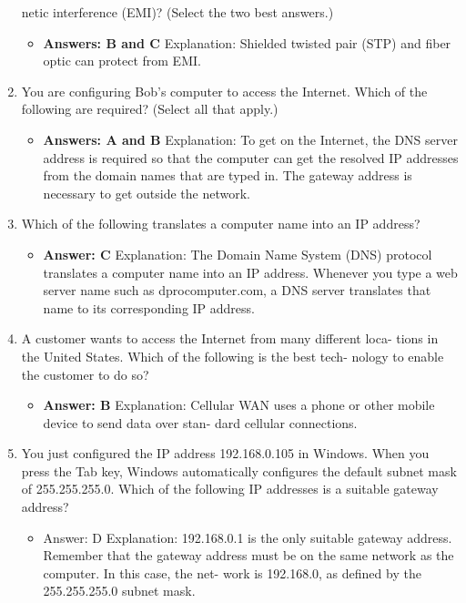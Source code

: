 \documentclass{article}
\begin{document}
\begin{enumerate}
netic interference (EMI)? (Select the two best answers.)
    \begin{itemize}
        \item  \textbf{Answers: B and C} Explanation: Shielded twisted pair (STP) and fiber optic can protect from EMI.
    \end{itemize}
    \item You are configuring Bob’s computer to access the Internet. Which
of the following are required? (Select all that apply.)
    \begin{itemize}
        \item \textbf{Answers: A and B}
Explanation: To get on the Internet, the DNS server address is required so that the
computer can get the resolved IP addresses from the domain names that are typed in.
The gateway address is necessary to get outside the network.
    \end{itemize}
    \item Which of the following translates a computer name into an IP
address?
    \begin{itemize}
        \item \textbf{Answer: C}
Explanation: The Domain Name System (DNS) protocol translates a computer name
into an IP address. Whenever you type a web server name such as dprocomputer.com,
a DNS server translates that name to its corresponding IP address.
    \end{itemize}
    \item A customer wants to access the Internet from many different loca-
tions in the United States. Which of the following is the best tech-
nology to enable the customer to do so?
    \begin{itemize}
        \item \textbf{Answer: B}
Explanation: Cellular WAN uses a phone or other mobile device to send data over stan-
dard cellular connections.
    \end{itemize}
    \item You just configured the IP address 192.168.0.105 in Windows.
When you press the Tab key, Windows automatically configures
the default subnet mask of 255.255.255.0. Which of the following
IP addresses is a suitable gateway address?
    \begin{itemize}
        \item Answer: D
Explanation: 192.168.0.1 is the only suitable gateway address. Remember that the
gateway address must be on the same network as the computer. In this case, the net-
work is 192.168.0, as defined by the 255.255.255.0 subnet mask.

\end{itemize}
\end{enumerate}
\end{document}
